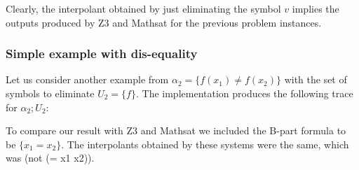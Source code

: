 Clearly, the interpolant obtained by just eliminating the symbol $v$ implies
the outputs produced by Z3 and Mathsat for the previous problem instances.

\subsubsection{Simple example with dis-equality}

Let us consider another example from \cite{KAPUR2017} 
$\alpha_2 = \{f(x_1) \neq f(x_2)\}$
with the set of symbols to eliminate $U_2 = \{f\}$. The implementation produces the following
trace for $\alpha_2; U_2$:



To compare our result with Z3 and Mathsat we 
included the B-part formula to be $\{x_1 = x_2\}$.
The interpolants obtained by these systems were the 
same, which was (not (= x1 x2)).



